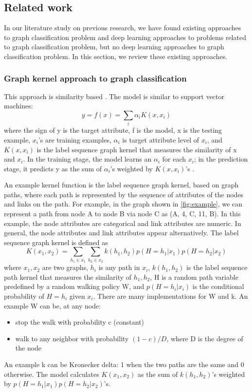 \documentclass{article}
\begin{document}
\subsection{Related work}
In our literature study on previous research,
we have found existing approaches to graph classification problem
and deep learning approaches to problems related to graph classification problem,
but no deep learning approaches to graph classification problem.
In this section, we review these existing approaches.

\subsubsection{Graph kernel approach to graph classification}
This approach is similarity based \cite{kashima2003marginalized}.
The model is similar to support vector machines:
\[ y = f(x) = \sum_{i} \alpha_i K(x, x_i) \]
where the sign of y is the target attribute, f is the model,
x is the testing example,
$ x_i $'s are training examples,
$ \alpha_i $ is target attribute level of $ x_i $,
and $ K(x, x_i) $ is the label sequence graph kernel
that measures the similarity of x and $ x_i $.
In the training stage,
the model learns an $ \alpha_i $ for each $ x_i $;
in the prediction stage,
it predicts y as 
the sum of $ \alpha_i $'s weighted by $ K(x, x_i) $'s \cite{scholkopf2001learning}.

An example kernel function is the label sequence graph kernel,
based on graph paths,
where each path is represented by the sequence of attributes of the nodes and links
on the path.
For example, in the graph shown in \autoref{fig:example},
we can represent a path from node A to node B via node C as (A, 4, C, 11, B).
In this example, the node attributes are categorical and link attributes are numeric.
In general, the node attributes and link attributes appear alternatively.
The label sequence graph kernel is defined as
\[ K(x_1, x_2) =
\sum_{h_1 \in x_1} \sum_{h_2 \in x_2} 
k(h_1, h_2) p(H = h_1 | x_1) p(H = h_2 | x_2) \]
where $ x_1, x_2 $ are two graphs,
$ h_i $ is any path in $ x_i $,
$ k(h_1, h_2) $ is the label sequence path kernel
that measures the similarity of $ h_1, h_2 $,
H is a random path variable predefined by a random walking policy W, and
$ p(H = h_i | x_i) $ is the conditional probability of $ H = h_i $ given $ x_i $.
There are many implementations for W and k.
An example W can be, at any node:
\begin{itemize}
	\item stop the walk with probability c (constant)
	\item walk to any neighbor with probability $ (1 - c) / D $,
	where D is the degree of the node
\end{itemize}
An example k can be Kronecker delta: 1 when the two paths are the same and 0 otherwise.
The model calculates $ K(x_1, x_2) $ as
the sum of $ k(h_1, h_2) $'s weighted by $ p(H = h_1 | x_1) p(H = h_2 | x_2) $'s.
\end{document}
